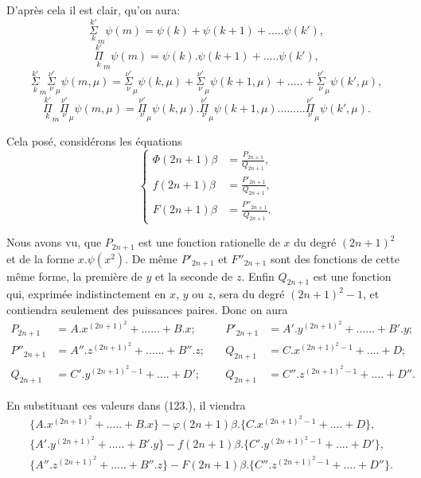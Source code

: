 \documentclass{article}
\begin{document}
D'après cela il est clair, qu'on aura:
\[ \overset{k'}{\underset{k}{\Sigma}}_{m}\psi(m)=\psi(k)+\psi(k+1)+.....\psi(k'), \tag{119.} \]
\[ \overset{k'}{\underset{k}{\Pi}}_{m}\psi(m)=\psi(k).\psi(k+1)+.....\psi(k'), \tag{120.} \]
\[ \overset{k'}{\underset{k}{\Sigma}}_{m}\overset{\nu'}{\underset{\nu}{\Sigma}}_{\mu}\psi(m,\mu)=\overset{\nu'}{\underset{\nu}{\Sigma}}_{\mu}\psi(k,\mu)+\overset{\nu'}{\underset{\nu}{\Sigma}}_{\mu}\psi(k+1,\mu)+.....+\overset{\nu'}{\underset{\nu}{\Sigma}}_{\mu}\psi(k',\mu), \tag{121.} \]
\[ \overset{k'}{\underset{k}{\Pi}}_{m}\overset{\nu'}{\underset{\nu}{\Pi}}_{\mu}\psi(m,\mu)=\overset{\nu'}{\underset{\nu}{\Pi}}_{\mu}\psi(k,\mu).\overset{\nu'}{\underset{\nu}{\Pi}}_{\mu}\psi(k+1,\mu).........\overset{\nu'}{\underset{\nu}{\Pi}}_{\mu}\psi(k',\mu). \tag{122.} \]


Cela posé, considérons les équations
\[ \left\{\begin{aligned}
\Phi(2n+1)\beta&=\frac{P_{2n+1}}{Q_{2n+1}},\\
f(2n+1)\beta&=\frac{P'_{2n+1}}{Q_{2n+1}},\\
F(2n+1)\beta&=\frac{P''_{2n+1}}{Q_{2n+1}}.
\end{aligned}\right. \tag{123.} \]

Nous avons vu, que $P_{2n+1}$ est une fonction rationelle de $x$ du degré $(2n+1)^{2}$ et de la forme $x.\psi(x^{2})$. De même $P'_{2n+1}$ et $F''_{2n+1}$ sont des fonctions de cette même forme, la première de $y$ et la seconde de $z$. Enfin $Q_{2n+1}$ est une fonction qui, exprimée indistinctement en $x$, $y$ ou $z$, sera du degré $(2n+1)^{2}-1$, et contiendra seulement des puissances paires.
Donc on aura
\[ \begin{aligned}
P_{2n+1}&=A.x^{(2n+1)^{2}}+......+B.x;&\quad P'_{2n+1}&=A'.y^{(2n+1)^{2}}+......+B'.y;\\
P''_{2n+1}&=A''.z^{(2n+1)^{2}}+......+B''.z;&\quad Q_{2n+1}&=C.x^{(2n+1)^{2}-1}+....+D;\\
Q_{2n+1}&=C'.y^{(2n+1)^{2}-1}+....+D';&\quad Q_{2n+1}&=C''.z^{(2n+1)^{2}-1}+....+D''.
\end{aligned} \]

En substituant ces valeurs dans (123.), il viendra
\[ \begin{aligned}
&\{A.x^{(2n+1)^{2}}+.....+B.x\}-\varphi(2n+1)\beta.\{C.x^{(2n+1)^{2}-1}+....+D\},\\
&\{A'.y^{(2n+1)^{2}}+.....+B'.y\}-f(2n+1)\beta.\{C'.y^{(2n+1)^{2}-1}+....+D'\},\\
&\{A''.z^{(2n+1)^{2}}+.....+B''.z\}-F(2n+1)\beta.\{C''.z^{(2n+1)^{2}-1}+....+D''\}.
\end{aligned} \]
\end{document}
